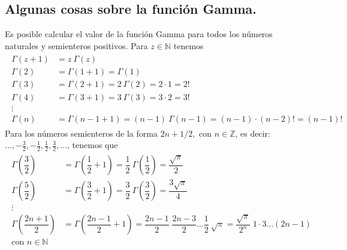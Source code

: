 \subsection{Algunas cosas sobre la función Gamma.}
Es posible calcular el valor de la función Gamma para todos los números naturales y semienteros positivos. Para $z \in \mathbb{N}$ tenemos
\begin{align*}
\begin{aligned}
\Gamma (z+1) &= z \: \Gamma (z) \\
\Gamma (2) &= \Gamma (1+1) = \Gamma (1) \\
\Gamma (3) &= \Gamma (2+1) = 2 \: \Gamma (2)= 2 \cdot 1 = 2! \\
\Gamma (4) &= \Gamma (3+1) = 3 \: \Gamma (3)= 3 \cdot 2 = 3! \\
\vdots \\
\Gamma (n) &= \Gamma (n-1+1) = (n-1) \: \Gamma (n-1)= (n - 1) \cdot (n - 2)! = (n-1)!
\end{aligned}
\end{align*}
Para los números semienteros de la forma $2n+1/2, \mbox{ con } n \in \mathbb{Z}$, es decir: $\ldots, -\frac{3}{2}, - \frac{1}{2}, \frac{1}{2}, \frac{3}{2}, \ldots$, tenemos que
\begin{align*}
\begin{aligned}
\Gamma \left( \dfrac{3}{2} \right) &= \Gamma \left( \dfrac{1}{2} + 1 \right) = \dfrac{1}{2} \: \Gamma \left( \dfrac{1}{2} \right) = \dfrac{\sqrt{\pi}}{2} \\
\Gamma \left( \dfrac{5}{2} \right) &= \Gamma \left( \dfrac{3}{2} + 1 \right) = \dfrac{3}{2} \: \Gamma \left( \dfrac{3}{2} \right) = \dfrac{3 \sqrt{\pi}}{4} \\
\vdots \\
\Gamma \left( \dfrac{2n + 1}{2} \right) &= \Gamma \left( \dfrac{2n - 1}{2} + 1 \right) = \dfrac{2n - 1}{2} \; \dfrac{2n - 3}{2} \ldots \dfrac{1}{2} \: \sqrt{\pi} = \dfrac{\sqrt{\pi}}{2^{n}} \; 1 \cdot 3 \ldots (2n-1) \\
\mbox{con } n \in \mathbb{N}
\end{aligned}
\end{align*}
